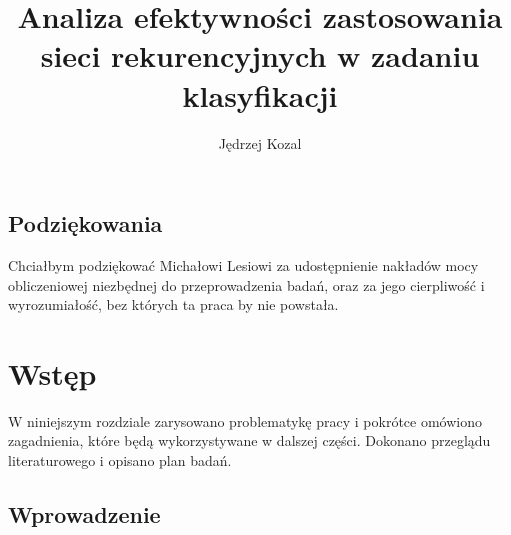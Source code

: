 \documentclass[oneside, mag]{mgr}
\title{Analiza efektywności zastosowania sieci rekurencyjnych w zadaniu klasyfikacji}
\author{Jędrzej Kozal}
\begin{document}
	

\maketitle

\hspace{0pt}
\vfill
\begin{center}
\section*{Podziękowania}
\end{center}

Chciałbym podziękować Michałowi Lesiowi za udostępnienie nakładów mocy obliczeniowej niezbędnej do przeprowadzenia badań, oraz za jego cierpliwość i wyrozumiałość, bez których ta praca by nie powstała.
\vfill
\hspace{0pt}

\setcounter{tocdepth}{1}
\tableofcontents

\newpage



\chapter{Wstęp}

W niniejszym rozdziale zarysowano problematykę pracy i pokrótce omówiono zagadnienia, które będą wykorzystywane w dalszej części. Dokonano przeglądu literaturowego i opisano plan badań.

\section{Wprowadzenie}
\end{document}
